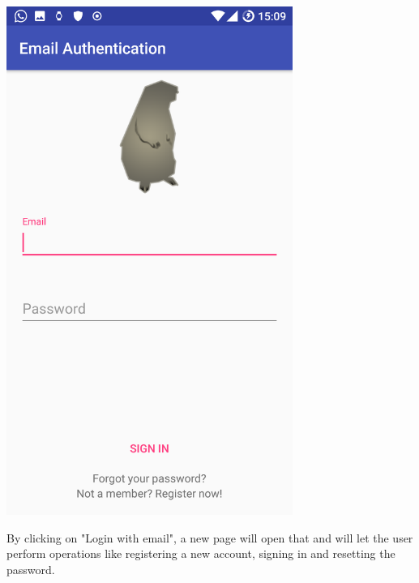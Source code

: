 \documentclass[a4paper]{scrreprt}
\begin{document}
\begin{minipage}{0.5\textwidth}
	\centering
	\includegraphics[width=0.7\textwidth]{imgs/authentication_email}
\end{minipage}
\begin{minipage}{0.5\textwidth}
	By clicking on "Login with email", a new page will open that and will let the user perform operations like registering a new account, signing in and resetting the password. 
\end{minipage}
\end{document}
